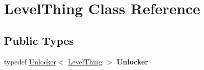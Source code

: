 \hypertarget{classLevelThing}{}\section{Level\+Thing Class Reference}
\label{classLevelThing}
\subsection*{Public Types}
\begin{DoxyCompactItemize}
\item 
\hypertarget{classLevelThing_ab398dde1e0148e7d93467321310baf9e}{}typedef \hyperlink{classUnlocker}{Unlocker}$<$ \hyperlink{classLevelThing}{Level\+Thing} $>$ {\bfseries Unlocker}\label{classLevelThing_ab398dde1e0148e7d93467321310baf9e}

\end{DoxyCompactItemize}
